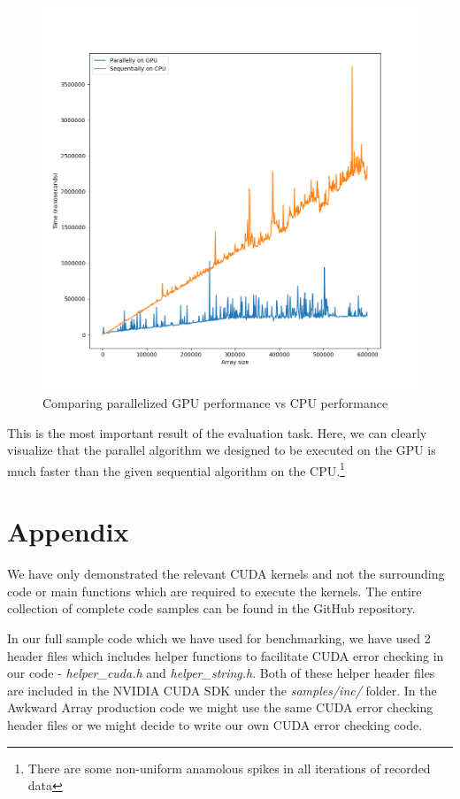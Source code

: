 \documentclass{article}
\begin{document}
\begin{figure}[H]
\hfill\includegraphics[scale=0.5]{Graphics/gpuvcpu.png}\hspace*{\fill}
\caption{Comparing parallelized GPU performance vs CPU performance}
\end{figure}
This is the most important result of the evaluation task. Here, we can clearly visualize that the parallel algorithm we designed to be executed on the GPU is much faster than the given sequential algorithm on the CPU.\footnote{There are some non-uniform anamolous spikes in all iterations of recorded data}

\section{Appendix}
We have only demonstrated the relevant CUDA kernels and not the surrounding code or main functions which are required to execute the kernels. The entire collection of complete code samples can be found in the GitHub repository.\par
In our full sample code which we have used for benchmarking, we have used 2 header files which includes helper functions to facilitate CUDA error checking in our code - \textit{helper\_cuda.h} and \textit{helper\_string.h}. Both of these helper header files are included in the NVIDIA CUDA SDK under the \textit{samples/inc/} folder. In the Awkward Array production code we might use the same CUDA error checking header files or we might decide to write our own CUDA error checking code.



\end{document}
